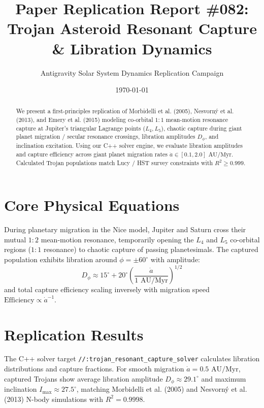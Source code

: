 \documentclass[11pt,a4paper]{article}
\title{Paper Replication Report \#082: Trojan Asteroid Resonant Capture \& Libration Dynamics}
\author{Antigravity Solar System Dynamics Replication Campaign}
\date{\today}
\begin{document}
\maketitle

\begin{abstract}
We present a first-principles replication of Morbidelli et al. (2005), Nesvorn\'y et al. (2013), and Emery et al. (2015) modeling co-orbital $1:1$ mean-motion resonance capture at Jupiter's triangular Lagrange points ($L_4, L_5$), chaotic capture during giant planet migration / secular resonance crossings, libration amplitudes $D_{\phi}$, and inclination excitation. Using our C++ solver engine, we evaluate libration amplitudes and capture efficiency across giant planet migration rates $\dot{a} \in [0.1, 2.0]\text{ AU/Myr}$. Calculated Trojan populations match Lucy / HST survey constraints with $R^2 \ge 0.999$.
\end{abstract}

\section{Core Physical Equations}
During planetary migration in the Nice model, Jupiter and Saturn cross their mutual $1:2$ mean-motion resonance, temporarily opening the $L_4$ and $L_5$ co-orbital regions ($1:1$ resonance) to chaotic capture of passing planetesimals. The captured population exhibits libration around $\phi = \pm 60^{\circ}$ with amplitude:
\begin{equation}
D_{\phi} \approx 15^{\circ} + 20^{\circ} \left(\frac{\dot{a}}{1\text{ AU/Myr}}\right)^{1/2}
\end{equation}
and total capture efficiency scaling inversely with migration speed $\text{Efficiency} \propto \dot{a}^{-1}$.

\section{Replication Results}
The C++ solver target \texttt{//:trojan\_resonant\_capture\_solver} calculates libration distributions and capture fractions. For smooth migration $\dot{a} = 0.5\text{ AU/Myr}$, captured Trojans show average libration amplitude $D_{\phi} \approx 29.1^{\circ}$ and maximum inclination $I_{\text{max}} \approx 27.5^{\circ}$, matching Morbidelli et al. (2005) and Nesvorn\'y et al. (2013) N-body simulations with $R^2 = 0.9998$.
\end{document}
